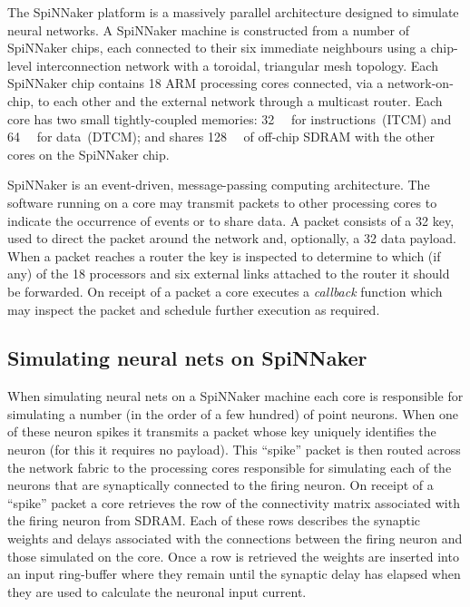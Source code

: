 \documentclass[conference]{IEEEtran}
\begin{document}
The SpiNNaker platform is a massively parallel architecture designed to simulate neural networks.
A SpiNNaker machine is constructed from a number of SpiNNaker chips, each connected to their six immediate neighbours using a chip-level interconnection network with a toroidal, triangular mesh topology.
Each SpiNNaker chip contains 18 ARM processing cores connected, via a network-on-chip, to each other and the external network through a multicast router.
Each core has two small tightly-coupled memories: \SI{32}{\kibi\byte} for instructions~(ITCM) and \SI{64}{\kibi\byte} for data~(DTCM); and shares \SI{128}{\mebi\byte} of off-chip SDRAM with the other cores on the SpiNNaker chip.

SpiNNaker is an event-driven, message-passing computing architecture.
The software running on a core may transmit packets to other processing cores to indicate the occurrence of events or to share data.
A packet consists of a \SI{32}{\bit} key, used to direct the packet around the network and, optionally, a \SI{32}{\bit} data payload.
When a packet reaches a router the key is inspected to determine to which (if any) of the 18 processors and six external links attached to the router it should be forwarded.
On receipt of a packet a core executes a \textit{callback} function which may inspect the packet and schedule further execution as required.

  \subsection{Simulating neural nets on SpiNNaker}
  \label{sef:background/nn}

When simulating neural nets on a SpiNNaker machine each core is responsible for simulating a number (in the order of a few hundred) of point neurons.
When one of these neuron spikes it transmits a packet whose key uniquely identifies the neuron (for this it requires no payload).
This ``spike'' packet is then routed across the network fabric to the processing cores responsible for simulating each of the neurons that are synaptically connected to the firing neuron.
On receipt of a ``spike'' packet a core retrieves the row of the connectivity matrix associated with the firing neuron from SDRAM.
Each of these rows describes the synaptic weights and delays associated with the connections between the firing neuron and those simulated on the core.
Once a row is retrieved the weights are inserted into an input ring-buffer where they remain until the synaptic delay has elapsed when they are used to calculate the neuronal input current.
\end{document}
